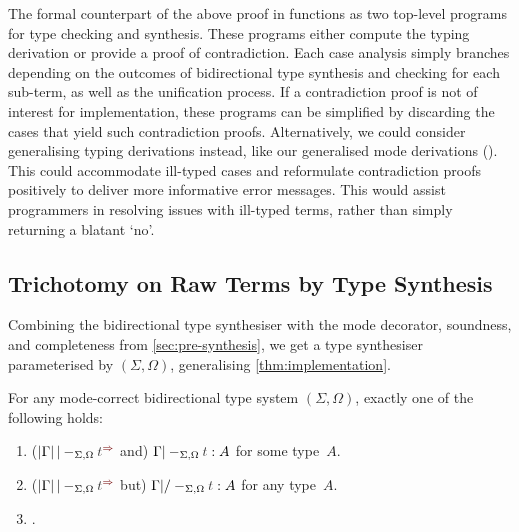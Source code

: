 The formal counterpart of the above proof in \Agda functions as two top-level programs for type checking and synthesis.
These programs either compute the typing derivation or provide a proof of contradiction.
Each case analysis simply branches depending on the outcomes of bidirectional type synthesis and checking for each sub-term, as well as the unification process.
If a contradiction proof is not of interest for implementation, these programs can be simplified by discarding the cases that yield such contradiction proofs.
Alternatively, we could consider generalising typing derivations instead, like our generalised mode derivations ().
This could accommodate ill-typed cases and reformulate contradiction proofs positively to deliver more informative error messages.
This would assist programmers in resolving issues with ill-typed terms, rather than simply returning a blatant `no'.

\subsection{Trichotomy on Raw Terms by Type Synthesis} \label{subsec:trichotomy}

Combining the bidirectional type synthesiser with the mode decorator, soundness, and completeness from \cref{sec:pre-synthesis}, we get a type synthesiser parameterised by $(\Sigma, \Omega)$, generalising \cref{thm:implementation}.

\begin{corollary}\label{cor:trichotomy}
  For any mode-correct bidirectional type system $(\Sigma, \Omega)$, 
  exactly one of the following holds:
  \begin{enumerate}
    \item (\/$\erase{\Gamma} |-_{\Sigma, \Omega} \isTerm{t}^{\syn}$ and)\/ $\Gamma |-_{\Sigma, \Omega} \isTerm{t} : A$ for some type~$A$.
    \item (\/$\erase{\Gamma} |-_{\Sigma, \Omega} \isTerm{t}^{\syn}$ but)\/ $\Gamma |/-_{\Sigma, \Omega} \isTerm{t} : A$ for any type~$A$.
    \item {}.
  \end{enumerate}
\end{corollary}
